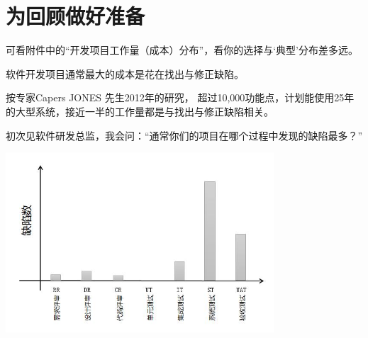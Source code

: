 \chapter{为回顾做好准备} %


可看附件中的``开发项目工作量（成本）分布''，看你的选择与`典型'分布差多远。

软件开发项目通常最大的成本是花在找出与修正缺陷。

按专家Capers JONES 先生2012年的研究，
超过10,000功能点，计划能使用25年的大型系统，接近一半的工作量都是与找出与修正缺陷相关。

\begin{description}
\item[]
\begin{description}
\tightlist
\item[]
= = =
\end{description}
\end{description}

初次见软件研发总监，我会问：``通常你们的项目在哪个过程中发现的缺陷最多？''

\begin{description}
\item[]
\end{description}


\includegraphics[width=10cm]{AR1缺陷数.jpg}

